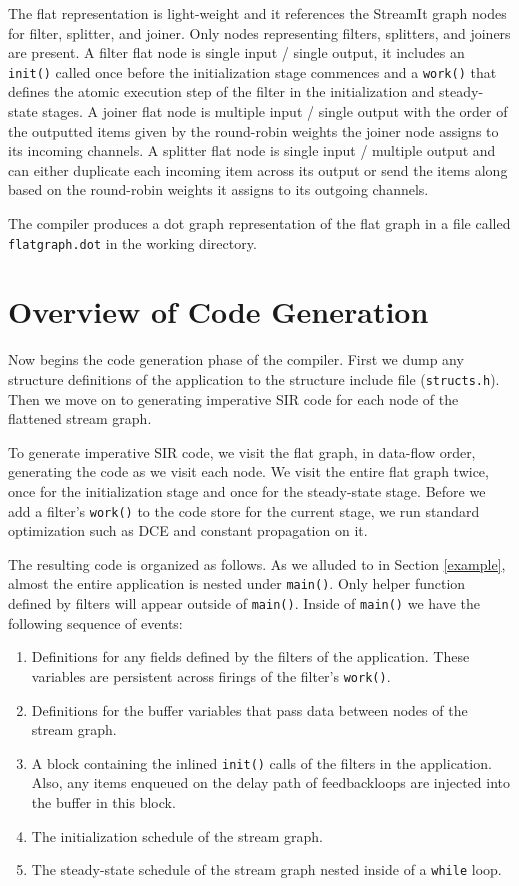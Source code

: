 \documentclass[10pt, letterpaper, onecolumn]{article}
\begin{document}
The flat representation is light-weight and it references the StreamIt
graph nodes for filter, splitter, and joiner.  Only nodes representing
filters, splitters, and joiners are present.  A filter flat node is
single input / single output, it includes an {\tt init()} called once
before the initialization stage commences and a {\tt work()} that
defines the atomic execution step of the filter in the initialization
and steady-state stages.  A joiner flat node is multiple input /
single output with the order of the outputted items given by the
round-robin weights the joiner node assigns to its incoming channels.
A splitter flat node is single input / multiple output and can either
duplicate each incoming item across its output or send the items along
based on the round-robin weights it assigns to its outgoing channels.

The compiler produces a dot graph representation of the flat graph in
a file called {\tt flatgraph.dot} in the working directory.

\section{Overview of Code Generation}
\label{codegen}
Now begins the code generation phase of the compiler.  First we dump
any structure definitions of the application to the structure
include file ({\tt structs.h}).  Then we move on to generating
imperative SIR code for each node of the flattened stream graph. 

To generate imperative SIR code, we visit the flat graph, in
data-flow order, generating the code as we visit each node.  We visit
the entire flat graph twice, once for the initialization stage and
once for the steady-state stage.  Before we add a filter's {\tt work()}
to the code store for the current stage, we run standard optimization
such as DCE and constant propagation on it.

The resulting code is organized as follows. As we alluded to in
Section \ref{example}, almost the entire application is nested under
{\tt main()}.  Only helper function defined by filters will appear
outside of {\tt main()}.  Inside of {\tt main()} we have the following
sequence of events:
\begin{enumerate}
\item Definitions for any fields defined by the filters of the
  application.  These variables are persistent across firings of the
  filter's {\tt work()}.
\item Definitions for the buffer variables that pass data between
  nodes of the stream graph.
\item A block containing the inlined {\tt init()} calls of the filters
  in the application.  Also, any items enqueued on the delay path of
  feedbackloops are injected into the buffer in this block.
\item The initialization schedule of the stream graph.  
\item The steady-state schedule of the stream graph nested inside of a
  {\tt while} loop.
\end{enumerate}
\end{document}
